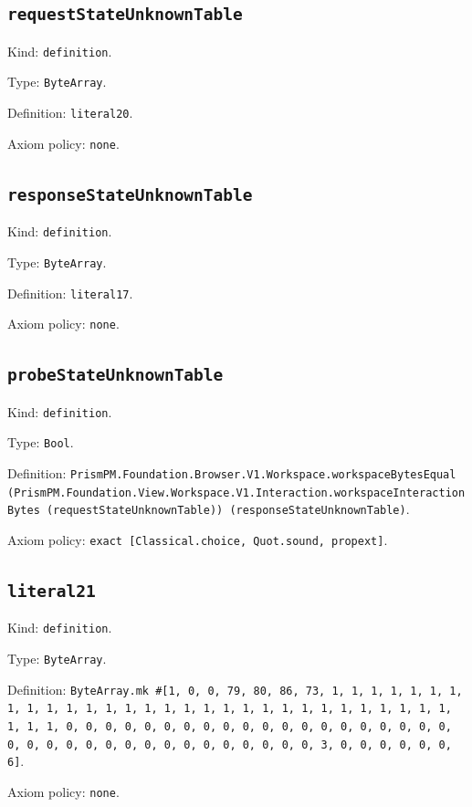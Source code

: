 \documentclass[11pt]{article}
\begin{document}
\subsection*{\texttt{requestStateUnknownTable}}
\noindent Kind: \texttt{definition}.\par
\noindent Type: \texttt{ByteArray}.\par
\noindent Definition: \texttt{literal20}.\par
\noindent Axiom policy: \texttt{none}.\par
\subsection*{\texttt{responseStateUnknownTable}}
\noindent Kind: \texttt{definition}.\par
\noindent Type: \texttt{ByteArray}.\par
\noindent Definition: \texttt{literal17}.\par
\noindent Axiom policy: \texttt{none}.\par
\subsection*{\texttt{probeStateUnknownTable}}
\noindent Kind: \texttt{definition}.\par
\noindent Type: \texttt{Bool}.\par
\noindent Definition: \texttt{PrismPM.Foundation.Browser.V1.Workspace.workspaceBytesEqual (PrismPM.Foundation.View.Workspace.V1.Interaction.workspaceInteractionBytes (requestStateUnknownTable)) (responseStateUnknownTable)}.\par
\noindent Axiom policy: \texttt{exact [Classical.choice, Quot.sound, propext]}.\par
\subsection*{\texttt{literal21}}
\noindent Kind: \texttt{definition}.\par
\noindent Type: \texttt{ByteArray}.\par
\noindent Definition: \texttt{ByteArray.mk \#[1, 0, 0, 79, 80, 86, 73, 1, 1, 1, 1, 1, 1, 1, 1, 1, 1, 1, 1, 1, 1, 1, 1, 1, 1, 1, 1, 1, 1, 1, 1, 1, 1, 1, 1, 1, 1, 1, 1, 1, 0, 0, 0, 0, 0, 0, 0, 0, 0, 0, 0, 0, 0, 0, 0, 0, 0, 0, 0, 0, 0, 0, 0, 0, 0, 0, 0, 0, 0, 0, 0, 0, 0, 0, 0, 0, 3, 0, 0, 0, 0, 0, 0, 6]}.\par
\noindent Axiom policy: \texttt{none}.\par
\end{document}
